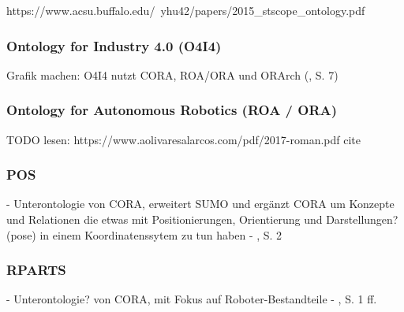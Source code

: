 \documentclass{article}
\begin{document}
https://www.acsu.buffalo.edu/~yhu42/papers/2015\_stscope\_ontology.pdf

\subsubsection{Ontology for Industry 4.0 (O4I4)}

\cite{kumar2019ontologies}

Grafik machen: O4I4 nutzt CORA, ROA/ORA und ORArch (\cite{kumar2019ontologies}, S. 7)

\subsubsection{Ontology for Autonomous Robotics (ROA / ORA)}
TODO lesen: https://www.aolivaresalarcos.com/pdf/2017-roman.pdf
cite \cite{olszewska2017ontology}

\subsubsection{POS}

- Unterontologie von CORA, erweitert SUMO und ergänzt CORA um Konzepte und Relationen die etwas mit Positionierungen, Orientierung und Darstellungen? (pose) in einem Koordinatenssytem zu tun haben - \cite{prestes2014core}, S. 2

\subsubsection{RPARTS}

- Unterontologie? von CORA, mit Fokus auf Roboter-Bestandteile - \cite{prestes2014core}, S. 1 ff.





\medskip

\printbibliography
\end{document}
